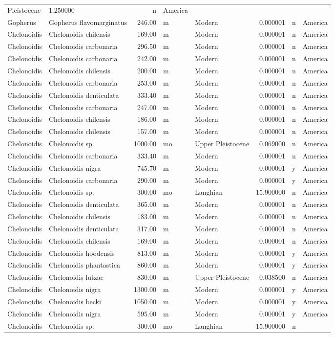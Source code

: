 \begin{landscape}
\begin{longtable}[]{@{}llrllrll@{}}
	Pleistocene & 1.250000 & n & America\tabularnewline
	Gopherus & Gopherus flavomarginatus & 246.00 & m & Modern & 0.000001 & n
	& America\tabularnewline
	Chelonoidis & Chelonoidis chilensis & 169.00 & m & Modern & 0.000001 & n
	& America\tabularnewline
	Chelonoidis & Chelonoidis carbonaria & 296.50 & m & Modern & 0.000001 &
	n & America\tabularnewline
	Chelonoidis & Chelonoidis carbonaria & 242.00 & m & Modern & 0.000001 &
	n & America\tabularnewline
	Chelonoidis & Chelonoidis chilensis & 200.00 & m & Modern & 0.000001 & n
	& America\tabularnewline
	Chelonoidis & Chelonoidis carbonaria & 253.00 & m & Modern & 0.000001 &
	n & America\tabularnewline
	Chelonoidis & Chelonoidis denticulata & 333.40 & m & Modern & 0.000001 &
	n & America\tabularnewline
	Chelonoidis & Chelonoidis carbonaria & 247.00 & m & Modern & 0.000001 &
	n & America\tabularnewline
	Chelonoidis & Chelonoidis chilensis & 186.00 & m & Modern & 0.000001 & n
	& America\tabularnewline
	Chelonoidis & Chelonoidis chilensis & 157.00 & m & Modern & 0.000001 & n
	& America\tabularnewline
	Chelonoidis & Chelonoidis sp. & 1000.00 & mo & Upper Pleistocene &
	0.069000 & n & America\tabularnewline
	Chelonoidis & Chelonoidis carbonaria & 333.40 & m & Modern & 0.000001 &
	n & America\tabularnewline
	Chelonoidis & Chelonoidis nigra & 745.70 & m & Modern & 0.000001 & y &
	America\tabularnewline
	Chelonoidis & Chelonoidis carbonaria & 290.00 & m & Modern & 0.000001 &
	y & America\tabularnewline
	Chelonoidis & Chelonoidis sp. & 300.00 & mo & Langhian & 15.900000 & n &
	America\tabularnewline
	Chelonoidis & Chelonoidis denticulata & 365.00 & m & Modern & 0.000001 &
	n & America\tabularnewline
	Chelonoidis & Chelonoidis chilensis & 183.00 & m & Modern & 0.000001 & n
	& America\tabularnewline
	Chelonoidis & Chelonoidis denticulata & 317.00 & m & Modern & 0.000001 &
	n & America\tabularnewline
	Chelonoidis & Chelonoidis chilensis & 169.00 & m & Modern & 0.000001 & n
	& America\tabularnewline
	Chelonoidis & Chelonoidis hoodensis & 813.00 & m & Modern & 0.000001 & y
	& America\tabularnewline
	Chelonoidis & Chelonoidis phantastica & 860.00 & m & Modern & 0.000001 &
	y & America\tabularnewline
	Chelonoidis & Chelonoidis lutzae & 830.00 & m & Upper Pleistocene &
	0.038500 & n & America\tabularnewline
	Chelonoidis & Chelonoidis nigra & 1300.00 & m & Modern & 0.000001 & y &
	America\tabularnewline
	Chelonoidis & Chelonoidis becki & 1050.00 & m & Modern & 0.000001 & y &
	America\tabularnewline
	Chelonoidis & Chelonoidis nigra & 595.00 & m & Modern & 0.000001 & y &
	America\tabularnewline
	Chelonoidis & Chelonoidis sp. & 300.00 & mo & Langhian & 15.900000 & n &

\end{longtable}
\end{landscape}
